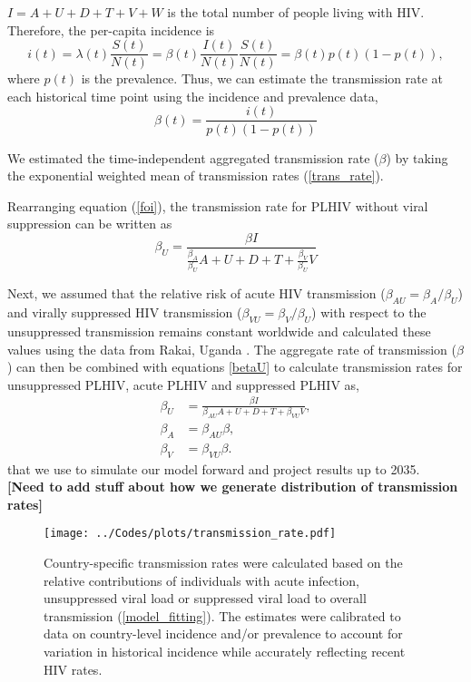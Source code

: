 \documentclass[11pt]{article}
\newcommand{\comment}[1]{\textbf{[#1]}}
\begin{document}
$I = A+U+D+T+V+W$ is the total number of people living with HIV. Therefore, the per-capita
incidence is
\begin{equation}
i(t) = \lambda(t) \frac{S(t)}{N(t)}
= \beta(t) \frac{I(t)}{N(t)} \frac{S(t)}{N(t)} =\beta(t) p(t) (1-p(t)),
\end{equation}
where $p(t)$ is the prevalence. Thus, we can estimate the
transmission rate at each historical time point using the incidence
and prevalence data,
\begin{equation}
  \label{trans_rate}
  \beta(t) = \frac{i(t)}{p(t)(1-p(t))}
\end{equation}


We estimated the time-independent aggregated transmission rate ($\beta$)
by taking the exponential weighted mean of transmission rates
(\ref{trans_rate}).


Rearranging equation (\ref{foi}), the transmission rate for PLHIV
without viral suppression can be written as
\begin{equation}
\label{betaU}
  \beta_{U} = \frac{\beta I}{\frac{\beta_{A}}{\beta_{U}}A +
    U+D+T+\frac{\beta_{V}}{\beta_{U}}V}
\end{equation}


Next, we assumed that the relative risk of acute HIV transmission
($\beta_{AU} = \beta_{A}/\beta_{U}$) and virally suppressed HIV
transmission ($\beta_{VU} = \beta_{V}/\beta_{U}$) with respect to the
unsuppressed transmission remains constant worldwide and calculated
these values using the data from Rakai, Uganda \cite{Wawer2005-us}. The aggregate
rate of transmission ($\beta$) can then be combined with equations \ref{betaU} to calculate transmission
rates for unsuppressed PLHIV, acute PLHIV and suppressed PLHIV as,
\begin{align}
  \beta_{U} & = \frac{\beta I}{\beta_{AU}A +
              U+D+T+\beta_{VU}V}, \\
  \beta_{A} & = \beta_{AU}\beta, \\
  \beta_{V} & = \beta_{VU} \beta.
\end{align}
that we use to simulate our model forward and project results up to 2035.
\\

\comment{Need to add stuff about how we generate distribution of
  transmission rates}




\begin{figure}
  \centering
  \texttt{[image: ../Codes/plots/transmission\_rate.pdf]}
  \caption{Country-specific transmission rates were calculated based
    on the relative contributions of individuals with acute infection,
    unsuppressed viral load or suppressed viral load to overall
    transmission (\autoref{model_fitting}). The estimates were
    calibrated to data on country-level incidence and/or prevalence to
    account for variation in historical incidence while accurately
    reflecting recent HIV rates.}
  \label{transmission_rate}
\end{figure}
\end{document}
